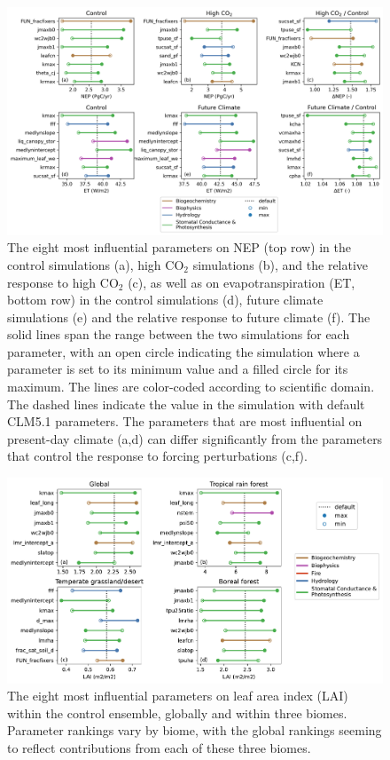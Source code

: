 \documentclass[draft]{agujournal2019}
\begin{document}
\begin{figure}[h]
\centering
\includegraphics[width=\textwidth]{../figs/main/deltas.png}
\caption{The eight most influential parameters  on NEP (top row) in the control simulations (a), high CO$_2$ simulations (b), and the relative response to high CO$_2$ (c), as well as on evapotranspiration (ET, bottom row) in the control simulations (d), future climate simulations (e) and the relative response to future climate (f).
The solid lines span the range between the two simulations for each parameter, with an open circle indicating the simulation where a parameter is set to its minimum value and a filled circle for its maximum. The lines are color-coded according to scientific domain. The dashed lines indicate the value in the simulation with default CLM5.1 parameters. 
The parameters that are most influential on present-day climate (a,d) can differ significantly from the parameters that control the response to forcing perturbations (c,f).}
\label{fig:nep}
\end{figure}


\begin{figure}[h]
\centering
\includegraphics[width=\textwidth]{../figs/main/lai_biome.pdf}
\caption{The eight most influential parameters  on leaf area index (LAI) within the control ensemble, globally and within three biomes.  Parameter rankings vary by biome, with the global rankings seeming to reflect contributions from each of these three biomes.}
\label{fig:lai}
\end{figure}
\end{document}
